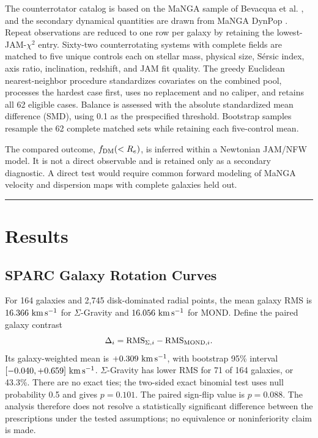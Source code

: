 \documentclass[aps,prd,reprint,superscriptaddress,showpacs,floatfix,longbibliography]{revtex4-2}
\begin{document}
The counterrotator catalog is based on the MaNGA sample of Bevacqua et al. \cite{ref10}, and the secondary dynamical quantities are drawn from MaNGA DynPop \cite{ref11}. Repeat observations are reduced to one row per galaxy by retaining the lowest-JAM-$\chi^2$ entry. Sixty-two counterrotating systems with complete fields are matched to five unique controls each on stellar mass, physical size, S\'ersic index, axis ratio, inclination, redshift, and JAM fit quality. The greedy Euclidean nearest-neighbor procedure standardizes covariates on the combined pool, processes the hardest case first, uses no replacement and no caliper, and retains all 62 eligible cases. Balance is assessed with the absolute standardized mean difference (SMD), using 0.1 as the prespecified threshold. Bootstrap samples resample the 62 complete matched sets while retaining each five-control mean.

The compared outcome, $f_{\rm DM}(<R_e)$, is inferred within a Newtonian JAM/NFW model. It is not a direct observable and is retained only as a secondary diagnostic. A direct test would require common forward modeling of MaNGA velocity and dispersion maps with complete galaxies held out.

\medskip\hrule\medskip

\section{Results}

\subsection{SPARC Galaxy Rotation Curves}

For 164 galaxies and 2,745 disk-dominated radial points, the mean galaxy RMS is $16.366\ {\rm km\,s^{-1}}$ for $\Sigma$-Gravity and $16.056\ {\rm km\,s^{-1}}$ for MOND. Define the paired galaxy contrast
\begin{equation}
\Delta_i={\rm RMS}_{\Sigma,i}-{\rm RMS}_{{\rm MOND},i}.
\label{eq:delta}
\end{equation}
Its galaxy-weighted mean is $+0.309\ {\rm km\,s^{-1}}$, with bootstrap 95\% interval $[-0.040,+0.659]\ {\rm km\,s^{-1}}$. $\Sigma$-Gravity has lower RMS for 71 of 164 galaxies, or 43.3\%. There are no exact ties; the two-sided exact binomial test uses null probability 0.5 and gives $p=0.101$. The paired sign-flip value is $p=0.088$. The analysis therefore does not resolve a statistically significant difference between the prescriptions under the tested assumptions; no equivalence or noninferiority claim is made.
\end{document}
